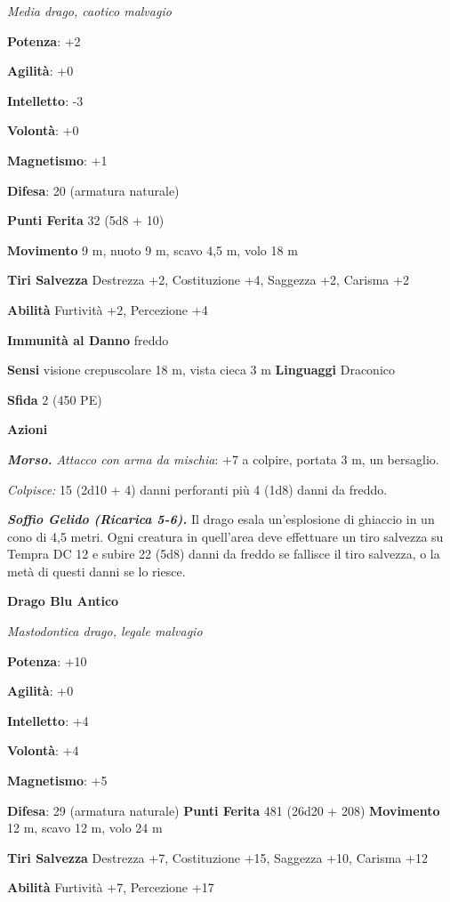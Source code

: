 \begin{multicols}{2}
\emph{Media drago, caotico malvagio}

\textbf{Potenza}: +2

\textbf{Agilità}: +0

\textbf{Intelletto}: -3

\textbf{Volontà}: +0

\textbf{Magnetismo}: +1

\textbf{Difesa}: 20 (armatura naturale)

\textbf{Punti Ferita} 32 (5d8 + 10)

\textbf{Movimento} 9 m, nuoto 9 m, scavo 4,5 m, volo 18 m

\textbf{Tiri Salvezza} Destrezza +2, Costituzione +4, Saggezza +2,
Carisma +2

\textbf{Abilità} Furtività +2, Percezione +4

\textbf{Immunità al Danno} freddo

\textbf{Sensi} visione crepuscolare 18 m, vista cieca 3 m
\textbf{Linguaggi} Draconico

\textbf{Sfida} 2 (450 PE)

\textbf{Azioni}

\emph{\textbf{Morso.} Attacco con arma da mischia}: +7 a colpire,
portata 3 m, un bersaglio.

\emph{Colpisce:} 15 (2d10 + 4) danni perforanti più 4 (1d8) danni da
freddo.

\emph{\textbf{Soffio Gelido (Ricarica 5-6).}} Il drago esala
un'esplosione di ghiaccio in un cono di 4,5 metri. Ogni creatura in
quell'area deve effettuare un tiro salvezza su Tempra DC 12 e
subire 22 (5d8) danni da freddo se fallisce il tiro salvezza, o la metà
di questi danni se lo riesce.



\textbf{Drago Blu Antico}

\emph{Mastodontica drago, legale malvagio}

\textbf{Potenza}: +10

\textbf{Agilità}: +0

\textbf{Intelletto}: +4

\textbf{Volontà}: +4

\textbf{Magnetismo}: +5

\textbf{Difesa}: 29 (armatura naturale) \textbf{Punti Ferita}
481 (26d20 + 208) \textbf{Movimento} 12 m, scavo 12 m, volo 24 m

\textbf{Tiri Salvezza} Destrezza +7, Costituzione +15, Saggezza +10,
Carisma +12

\textbf{Abilità} Furtività +7, Percezione +17


\end{multicols}
